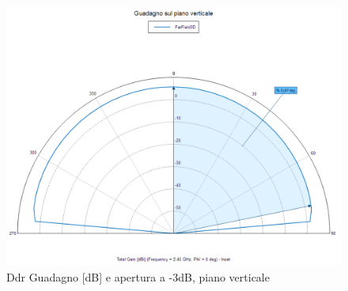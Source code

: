 \documentclass[twoside,twocolumn]{article}
\begin{document}
\begin{figure}[h!]
  \includegraphics[width=\linewidth]{A_verticale.png}
  \caption{Ddr Guadagno [dB] e apertura a -3dB, piano verticale}
  \label{fig:A_verticale}
\end{figure}
\end{document}
